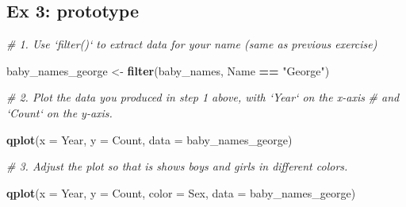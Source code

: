 \documentclass[]{book}
\newenvironment{Shaded}{\begin{snugshade}}{\end{snugshade}}
\newcommand{\KeywordTok}[1]{\textcolor[rgb]{0.13,0.29,0.53}{\textbf{#1}}}
\newcommand{\DataTypeTok}[1]{\textcolor[rgb]{0.13,0.29,0.53}{#1}}
\newcommand{\StringTok}[1]{\textcolor[rgb]{0.31,0.60,0.02}{#1}}
\newcommand{\CommentTok}[1]{\textcolor[rgb]{0.56,0.35,0.01}{\textit{#1}}}
\newcommand{\OperatorTok}[1]{\textcolor[rgb]{0.81,0.36,0.00}{\textbf{#1}}}
\newcommand{\NormalTok}[1]{#1}
\begin{document}
\subsection{Ex 3: prototype}\label{ex-3-prototype}

\begin{Shaded}
\begin{Highlighting}[]
\CommentTok{# 1. Use `filter()` to extract data for your name (same as previous exercise)  }
\end{Highlighting}
\end{Shaded}

\begin{Shaded}
\begin{Highlighting}[]
\NormalTok{baby_names_george <-}\StringTok{ }\KeywordTok{filter}\NormalTok{(baby_names, Name }\OperatorTok{==}\StringTok{ "George"}\NormalTok{)}
\end{Highlighting}
\end{Shaded}

\begin{Shaded}
\begin{Highlighting}[]
\CommentTok{# 2.  Plot the data you produced in step 1 above, with `Year` on the x-axis}
\CommentTok{#     and `Count` on the y-axis.}
\end{Highlighting}
\end{Shaded}

\begin{Shaded}
\begin{Highlighting}[]
\KeywordTok{qplot}\NormalTok{(}\DataTypeTok{x =}\NormalTok{ Year, }\DataTypeTok{y =}\NormalTok{ Count, }\DataTypeTok{data =}\NormalTok{ baby_names_george)}
\end{Highlighting}
\end{Shaded}

\begin{Shaded}
\begin{Highlighting}[]
\CommentTok{# 3. Adjust the plot so that is shows boys and girls in different colors.}
\end{Highlighting}
\end{Shaded}

\begin{Shaded}
\begin{Highlighting}[]
\KeywordTok{qplot}\NormalTok{(}\DataTypeTok{x =}\NormalTok{ Year, }\DataTypeTok{y =}\NormalTok{ Count, }\DataTypeTok{color =}\NormalTok{ Sex, }\DataTypeTok{data =}\NormalTok{ baby_names_george)}
\end{Highlighting}
\end{Shaded}
\end{document}
